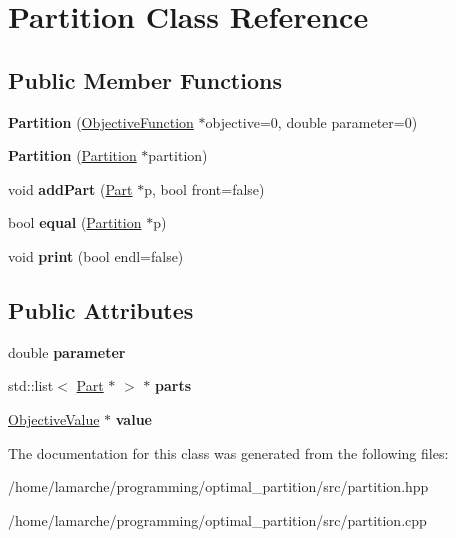 \hypertarget{classPartition}{\section{Partition Class Reference}
\label{classPartition}
}
\subsection*{Public Member Functions}
\begin{DoxyCompactItemize}
\item 
\hypertarget{classPartition_ab2274b9cf773fea65da75facdf88ae98}{{\bfseries Partition} (\hyperlink{classObjectiveFunction}{Objective\-Function} $\ast$objective=0, double parameter=0)}\label{classPartition_ab2274b9cf773fea65da75facdf88ae98}

\item 
\hypertarget{classPartition_acb291b3b0ccf48005e141be32fdd7efd}{{\bfseries Partition} (\hyperlink{classPartition}{Partition} $\ast$partition)}\label{classPartition_acb291b3b0ccf48005e141be32fdd7efd}

\item 
\hypertarget{classPartition_a63f82a3a75dc0c3d0d27766b2459c9fe}{void {\bfseries add\-Part} (\hyperlink{classPart}{Part} $\ast$p, bool front=false)}\label{classPartition_a63f82a3a75dc0c3d0d27766b2459c9fe}

\item 
\hypertarget{classPartition_abced08b339e293866a614b2f21414375}{bool {\bfseries equal} (\hyperlink{classPartition}{Partition} $\ast$p)}\label{classPartition_abced08b339e293866a614b2f21414375}

\item 
\hypertarget{classPartition_a3463b34ab90d020ed40635c473301a64}{void {\bfseries print} (bool endl=false)}\label{classPartition_a3463b34ab90d020ed40635c473301a64}

\end{DoxyCompactItemize}
\subsection*{Public Attributes}
\begin{DoxyCompactItemize}
\item 
\hypertarget{classPartition_a1125b9b5548fa65e98a6dd94279c53bc}{double {\bfseries parameter}}\label{classPartition_a1125b9b5548fa65e98a6dd94279c53bc}

\item 
\hypertarget{classPartition_a887cae6498c54754779d7956b48e8d3e}{std\-::list$<$ \hyperlink{classPart}{Part} $\ast$ $>$ $\ast$ {\bfseries parts}}\label{classPartition_a887cae6498c54754779d7956b48e8d3e}

\item 
\hypertarget{classPartition_acb93c172b3e9a1bb4c6e0b1c5a50a13d}{\hyperlink{classObjectiveValue}{Objective\-Value} $\ast$ {\bfseries value}}\label{classPartition_acb93c172b3e9a1bb4c6e0b1c5a50a13d}

\end{DoxyCompactItemize}


The documentation for this class was generated from the following files\-:\begin{DoxyCompactItemize}
\item 
/home/lamarche/programming/optimal\-\_\-partition/src/partition.\-hpp\item 
/home/lamarche/programming/optimal\-\_\-partition/src/partition.\-cpp\end{DoxyCompactItemize}
